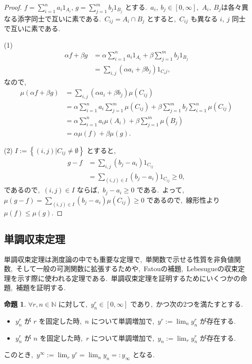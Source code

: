 \documentclass[a4j,11pt]{jarticle}
\theoremstyle{definition}
\newtheorem{proposition}[theorem]{命題}
\begin{document}
\begin{proof}
  $f = \sum_{i=1}^n a_i 1_{A_i}$, 
  $g = \sum_{j=1}^m b_j 1_{B_j}$
  とする.\ 
  $a_i,\ b_j \in \left[ 0, \infty\right]$,\ 
  $A_i,\ B_j$は各々異なる添字同士で互いに素である.\ 
  $C_{ij} = A_i \cap B_j$
  とすると,\ 
  $C_{ij}$
  も異なる
  $i,\ j$
  同士で互いに素である.\ 

  (1)
  \begin{align}
    \alpha f + \beta g
    & = \alpha \sum_{i=1}^n a_i 1_{A_i} + \beta \sum_{j=1}^m b_j 1_{B_j} \\
    & = \sum_{i,j} \left( \alpha a_i + \beta b_j \right) 1_{C_ij},
  \end{align}
  なので,\ 
  \begin{align}
    \mu(\alpha f + \beta g)
    & = \sum_{i,j} \left( \alpha a_i + \beta b_j\right) \mu(C_{ij}) \\
    & = \alpha \sum_{i=1}^n a_i \sum_{j=1}^m \mu(C_{ij}) + \beta \sum_{j=1}^m b_j \sum_{i=1}^n \mu(C_{ij}) \\
    & = \alpha \sum_{i=1}^n a_i \mu(A_i) + \beta \sum_{j=1}^m \mu(B_j) \\
    & = \alpha \mu(f) + \beta \mu(g).
  \end{align}

  (2)
  $I := \left\{(i,j) | C_{ij} \neq \emptyset \right\}$
  とすると,\ 
  \begin{align}
    g- f
    & = \sum_{i,j} (b_j - a_i) 1_{C_{ij}} \\
    & = \sum_{(i,j) \in I} (b_j - a_i) 1_{C_{ij}} \geq 0,
  \end{align}
  であるので,\ 
  $(i,j) \in I$
  ならば,\ 
  $b_j - a_i \geq 0$
  である.\ 
  よって,\ 
  $\mu(g-f) = \sum_{(i,j) \in I} (b_j-a_i) \mu(C_{ij}) \geq 0$
  であるので,\ 線形性より
  $\mu(f) \leq \mu(g)$.
\end{proof}

\subsection{単調収束定理}
単調収束定理は測度論の中でも重要な定理で,\ 単関数で示せる性質を非負値関数,\ そして一般の可測関数に拡張するためや,\ Fatouの補題,\ Lebesugueの収束定理を示す際に使われる定理である.\ 
単調収束定理を証明するためにいくつかの命題,\ 補題を証明する.\ 

\begin{proposition}\label{prop:doubly}
  $\forall r, n \in \mathbb{N}$
  に対して,\ 
  $y_n^r \in \left[ 0,\infty \right]$
  であり,\ かつ次の2つを満たすとする.\ 
  \begin{itemize}
    \item 
      $y_n^r$
      が
      $r$
      を固定した時,\ 
      $n$
      について単調増加で,\ 
      $y^r:=\lim_n y_n^r$
      が存在する.\ 
    \item
      $y_n^r$
      が
      $n$
      を固定した時,\ 
      $r$
      について単調増加で,\ 
      $y_n:=\lim_r y_n^r$
      が存在する.\ 
  \end{itemize}
  このとき,\ 
  $y^\infty:=\lim_r y^r = \lim_n y_n=:y_\infty$
  となる.\ 
\end{proposition}
\end{document}
